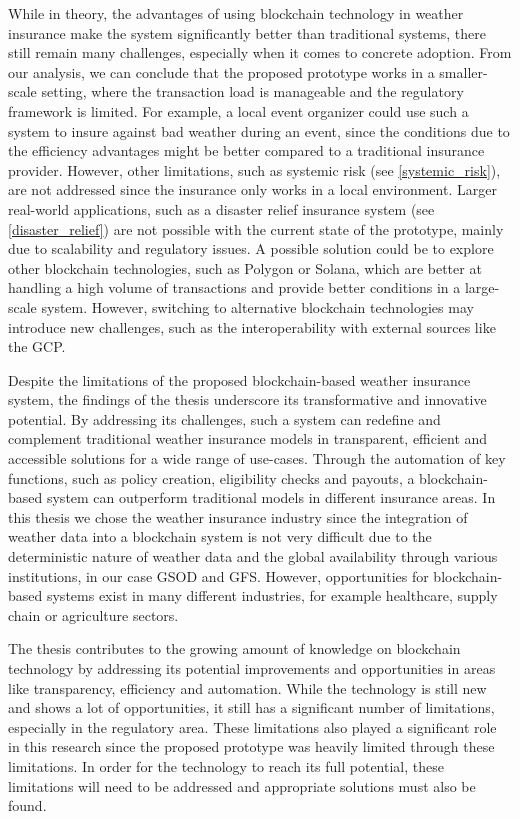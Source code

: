 While in theory, the advantages of using blockchain technology in weather insurance make the system significantly better than traditional systems, there still remain many challenges, especially when it comes to concrete adoption. From our analysis, we can conclude that the proposed prototype works in a smaller-scale setting, where the transaction load is manageable and the regulatory framework is limited. For example, a local event organizer could use such a system to insure against bad weather during an event, since the conditions due to the efficiency advantages might be better compared to a traditional insurance provider. However, other limitations, such as systemic risk (see \cref{systemic_risk}), are not addressed since the insurance only works in a local environment. Larger real-world applications, such as a disaster relief insurance system (see \cref{disaster_relief}) are not possible with the current state of the prototype, mainly due to scalability and regulatory issues. A possible solution could be to explore other blockchain technologies, such as Polygon or Solana, which are better at handling a high volume of transactions and provide better conditions in a large-scale system. However, switching to alternative blockchain technologies may introduce new challenges, such as the interoperability with external sources like the GCP.

Despite the limitations of the proposed blockchain-based weather insurance system, the findings of the thesis underscore its transformative and innovative potential. By addressing its challenges, such a system can redefine and complement traditional weather insurance models in transparent, efficient and accessible solutions for a wide range of use-cases. Through the automation of key functions, such as policy creation, eligibility checks and payouts, a blockchain-based system can outperform traditional models in different insurance areas. In this thesis we chose the weather insurance industry since the integration of weather data into a blockchain system is not very difficult due to the deterministic nature of weather data and the global availability through various institutions, in our case GSOD and GFS. However, opportunities for blockchain-based systems exist in many different industries, for example healthcare, supply chain or agriculture sectors.

The thesis contributes to the growing amount of knowledge on blockchain technology by addressing its potential improvements and opportunities in areas like transparency, efficiency and automation. While the technology is still new and shows a lot of opportunities, it still has a significant number of limitations, especially in the regulatory area. These limitations also played a significant role in this research since the proposed prototype was heavily limited through these limitations. In order for the technology to reach its full potential, these limitations will need to be addressed and appropriate solutions must also be found.

